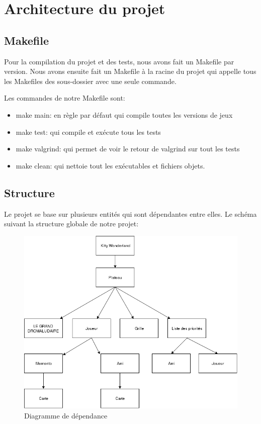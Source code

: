 \documentclass[10pt,a4paper]{article}
\begin{document}
\newpage
\section{Architecture du projet}
\subsection{Makefile}
Pour la compilation du projet et des tests, nous avons fait un Makefile par version. Nous avons ensuite fait un Makefile à la racine du projet qui appelle tous les Makefiles des sous-dossier avec une seule commande. 

Les commandes de notre Makefile sont: 
\begin{itemize}
\item make main: en règle par défaut qui compile toutes les versions de jeux
\item make test: qui compile et exécute tous les tests
\item make valgrind: qui permet de voir le retour de valgrind sur tout les tests
\item make clean: qui nettoie tout les exécutables et fichiers objets. 
\end{itemize}

\subsection{Structure}
Le projet se base sur plusieurs entités qui sont dépendantes entre elles. Le schéma suivant la structure globale de notre projet: 

\begin{figure}[!h]
\centering
\includegraphics[width=\textwidth]{V6plus.png}
\caption{\label{fig:v_base}Diagramme de dépendance}
\end{figure}
\end{document}
